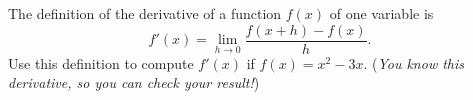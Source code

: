The definition of the derivative of a function $f(x)$ of one variable is
	$$f'(x) = \lim_{h\to 0} \frac{f(x+h) - f(x)}{h}.$$
Use this definition to compute $f'(x)$ if $f(x) = x^2 - 3 x$.  (\emph{You know this derivative, so you can check your result!})
